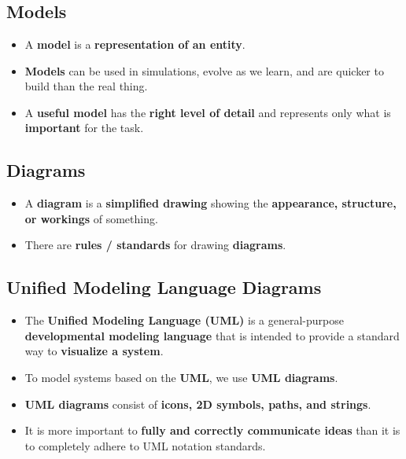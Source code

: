 \documentclass[16pt]{article}
\begin{document}
    \section*{}

    \subsection*{Models}
    \begin{itemize}
        \item A \textbf{model} is a \textbf{representation of an entity}.
        \item \textbf{Models} can be used in simulations, evolve as we learn, and are quicker to build than the real thing.
        \item A \textbf{useful model} has the \textbf{right level of detail} and represents only what is \textbf{important} for the task.
    \end{itemize}

    \subsection*{Diagrams}
    \begin{itemize}
        \item A \textbf{diagram} is a \textbf{simplified drawing} showing the \textbf{appearance, structure, or workings} of something.
        \item There are \textbf{rules / standards} for drawing \textbf{diagrams}.
    \end{itemize}

    \subsection*{Unified Modeling Language Diagrams}
    \begin{itemize}
        \item The \textbf{Unified Modeling Language (UML)} is a general-purpose \textbf{developmental modeling language} that is intended to provide a standard way to \textbf{visualize a system}.
        \item To model systems based on the \textbf{UML}, we use \textbf{UML diagrams}.
        \item \textbf{UML diagrams} consist of \textbf{icons, 2D symbols, paths, and strings}.
        \item It is more important to \textbf{fully and correctly communicate ideas} than it is to completely adhere to UML notation standards. 
    \end{itemize}
\end{document}
